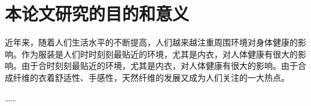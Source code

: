 \section{本论文研究的目的和意义}

近年来，随着人们生活水平的不断提高，人们越来越注重周围环境对身体健康的影响。作为服装是人们时时刻刻最贴近的环境，尤其是内衣，对人体健康有很大的影响。由于合时刻刻最贴近的环境，尤其是内衣，对人体健康有很大的影响。由于合成纤维的衣着舒适性、手感性，天然纤维的发展又成为人们关注的一大热点。

……
